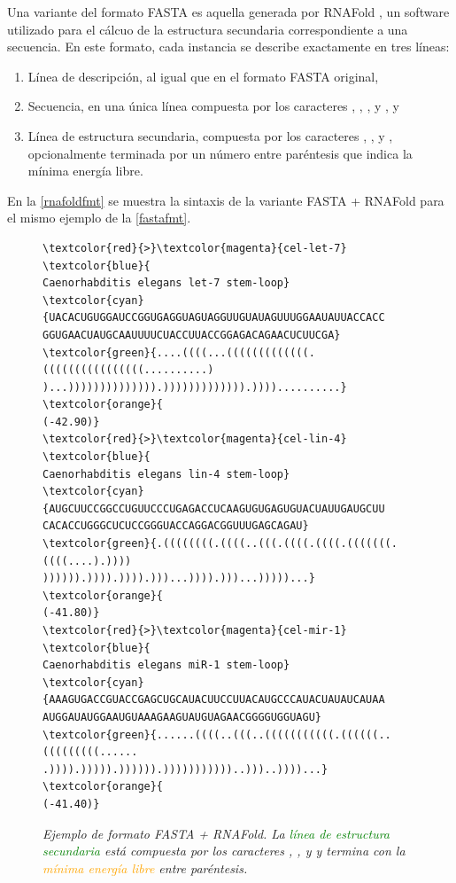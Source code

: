 \documentclass[12pt,bibliography=oldstyle,DIV=12,parskip=half-]{scrreprt}
\begin{document}
Una variante del formato FASTA es aquella generada por RNAFold
\cite{vienna}, un software utilizado para el cálcuo de la estructura
secundaria correspondiente a una secuencia.  En este formato, cada
instancia se describe exactamente en tres líneas:
%
\begin{enumerate}
\item Línea de descripción, al igual que en el formato FASTA original,
\item Secuencia, en una única línea compuesta por los caracteres
  , , , y , y
\item Línea de estructura secundaria, compuesta por los caracteres
  \mono{(}, \mono{)}, y , opcionalmente terminada por un
  número entre paréntesis que indica la mínima energía libre.
\end{enumerate}
%
En la \autoref{rnafoldfmt} se muestra la sintaxis de la variante FASTA + RNAFold
para el mismo ejemplo de la \autoref{fastafmt}.

\begin{figure}
\centering
\begin{Verbatim}[fontsize=\scriptsize,frame=single]
\textcolor{red}{>}\textcolor{magenta}{cel-let-7} \textcolor{blue}{
Caenorhabditis elegans let-7 stem-loop}
\textcolor{cyan}{UACACUGUGGAUCCGGUGAGGUAGUAGGUUGUAUAGUUUGGAAUAUUACCACC
GGUGAACUAUGCAAUUUUCUACCUUACCGGAGACAGAACUCUUCGA}
\textcolor{green}{....((((...(((((((((((((.((((((((((((((((..........)
)...)))))))))))))).))))))))))))).))))..........} \textcolor{orange}{
(-42.90)}
\textcolor{red}{>}\textcolor{magenta}{cel-lin-4} \textcolor{blue}{
Caenorhabditis elegans lin-4 stem-loop}
\textcolor{cyan}{AUGCUUCCGGCCUGUUCCCUGAGACCUCAAGUGUGAGUGUACUAUUGAUGCUU
CACACCUGGGCUCUCCGGGUACCAGGACGGUUUGAGCAGAU}
\textcolor{green}{.((((((((.((((..(((.((((.((((.(((((((.((((....).))))
)))))).)))).)))).)))...)))).)))...)))))...} \textcolor{orange}{
(-41.80)}
\textcolor{red}{>}\textcolor{magenta}{cel-mir-1} \textcolor{blue}{
Caenorhabditis elegans miR-1 stem-loop}
\textcolor{cyan}{AAAGUGACCGUACCGAGCUGCAUACUUCCUUACAUGCCCAUACUAUAUCAUAA
AUGGAUAUGGAAUGUAAAGAAGUAUGUAGAACGGGGUGGUAGU}
\textcolor{green}{......((((..(((..(((((((((((.((((((..(((((((((......
.)))).))))).)))))).)))))))))))..)))..))))...} \textcolor{orange}{
(-41.40)}
\end{Verbatim}
\caption{\small\slshape Ejemplo de formato FASTA + RNAFold. La
  \textcolor{green}{línea de estructura secundaria} está compuesta por
  los caracteres \mono{(}, \mono{)}, y   y termina con la
  \textcolor{orange}{mínima energía libre} entre paréntesis.}
\label{rnafoldfmt}
\end{figure}
\end{document}
